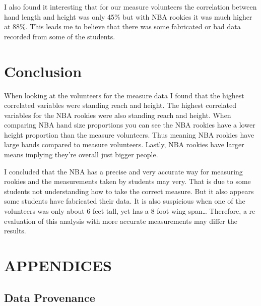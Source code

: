 \documentclass[]{article}
\begin{document}
\noindent I also found it interesting that for our measure volunteers
the correlation between hand length and height was only 45\% but with
NBA rookies it was much higher at 88\%. This leads me to believe that
there was some fabricated or bad data recorded from some of the
students.

\section{Conclusion}
\label{sec:conclusion}

When looking at the volunteers for the measure data I found that the
highest correlated variables were standing reach and height. The highest
correlated variables for the NBA rookies were also standing reach and
height. When comparing NBA hand size proportions you can see the NBA
rookies have a lower height proportion than the measure volunteers. Thus
meaning NBA rookies have large hands compared to measure volunteers.
Lastly, NBA rookies have larger means implying they're overall just
bigger people. \newline

\noindent I concluded that the NBA has a precise and very accurate way
for measuring rookies and the measurements taken by students may very.
That is due to some students not understanding how to take the correct
measure. But it also appears some students have fabricated their data.
It is also suspicious when one of the volunteers was only about 6 feet
tall, yet has a 8 foot wing span\ldots{} Therefore, a re evaluation of
this analysis with more accurate measurements may differ the results.

\section{APPENDICES}
\label{sec:appendix}

\subsection{Data Provenance}
\label{sec:appendix-data-provenance}
\end{document}
